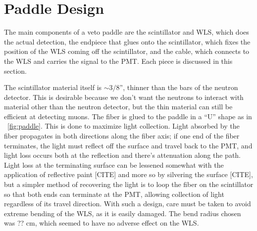 \section{Paddle Design}

The main components of a veto paddle are the scintillator and WLS, which does the actual detection, the endpiece that glues onto the scintillator, which fixes the position of the WLS coming off the scintillator, and the cable, which connects to the WLS and carries the signal to the PMT.  Each piece is discussed in this section.

The scintillator material itself is $\sim3/8$'', thinner than the bars of the neutron detector.  This is desirable because we don't want the neutrons to interact with material other than the neutron detector, but the thin material can still be efficient at detecting muons.  The fiber is glued to the paddle in a ``U'' shape as in {\fig}~\ref{fig:paddle}.  This is done to maximize light collection.  Light absorbed by the fiber propagates in both directions along the fiber axis; if one end of the fiber terminates, the light must reflect off the surface and travel back to the PMT, and light loss occurs both at the reflection and there's attenuation along the path.  Light loss at the terminating surface can be lessened somewhat with the application of reflective paint [CITE] and more so by silvering the surface [CITE], but a simpler method of recovering the light is to loop the fiber on the scintillator so that both ends can terminate at the PMT, allowing collection of light regardless of its travel direction.  With such a design, care must be taken to avoid extreme bending of the WLS, as it is easily damaged.  The bend radius chosen was ?? cm, which seemed to have no adverse effect on the WLS.

